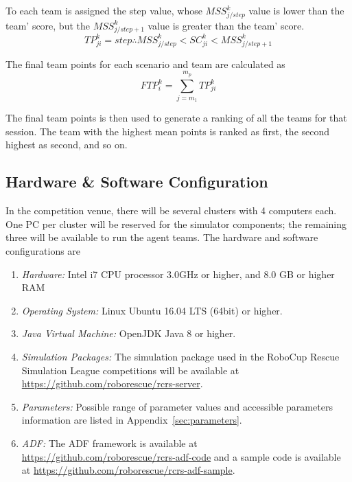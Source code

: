 \documentclass{article}
\begin{document}
To each team is assigned the step value, whose $MSS_{j/step}^{k}$ value is lower than the team' score, but the $MSS_{j/step+1}^{k}$ value is greater than the team' score.
\begin{equation}
TP_{ji}^{k} = step \therefore MSS_{j/step}^{k} < SC_{ji}^{k} < MSS_{j/step+1}^{k}
\end{equation}

The final team points for each scenario and team are calculated as
\begin{equation}
FTP_{i}^{k} = \sum_{j=m_{1}}^{m_{p}}{TP_{ji}^{k}}
\end{equation}

The final team points is then used to generate a ranking of all the teams for that session. The team with the highest mean points is ranked as first, the second highest as second, and so on.
\subsection{Hardware \& Software Configuration}
In the competition venue, there will be several clusters with 4 computers each. One PC per cluster will be reserved for the simulator components; the remaining three will be available to run the agent teams. The hardware and software configurations are
\begin{enumerate}[ ]
\item \emph{Hardware:} Intel i7 CPU processor 3.0GHz or higher, and 8.0 GB or higher RAM








\item \emph{Operating System:} Linux Ubuntu 16.04 LTS (64bit) or higher.
\item \emph{Java Virtual Machine:} OpenJDK Java 8 or higher.
\item \emph{Simulation Packages:} The simulation package used in the RoboCup Rescue Simulation League competitions will be available at \url{https://github.com/roborescue/rcrs-server}.
\item \emph{Parameters:} Possible range of parameter values and accessible parameters information are listed in Appendix~\ref{sec:parameters}.
\item \emph{ADF:} The ADF framework is available at \url{https://github.com/roborescue/rcrs-adf-code} and a sample code is available at \url{https://github.com/roborescue/rcrs-adf-sample}.
\end{enumerate}
\end{document}

